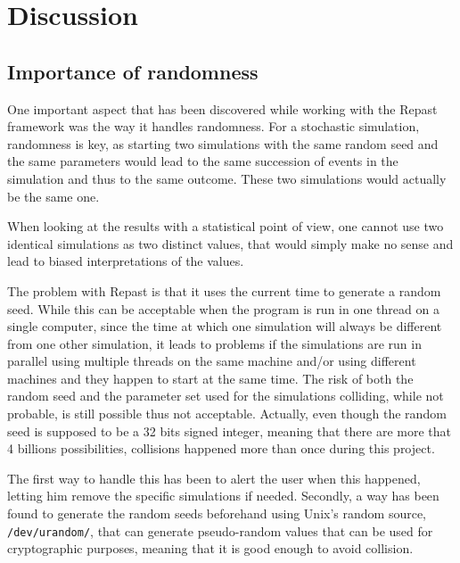 \documentclass[a4paper,12pt]{report}
\begin{document}
\chapter{Discussion}
\section{Importance of randomness}
One important aspect that has been discovered while working with the Repast framework was the way it handles randomness. For a stochastic simulation, randomness is key, as starting two simulations with the same random seed and the same parameters would lead to the same succession of events in the simulation and thus to the same outcome. These two simulations would actually be the same one.

When looking at the results with a statistical point of view, one cannot use two identical simulations as two distinct values, that would simply make no sense and lead to biased interpretations of the values.

The problem with Repast is that it uses the current time to generate a random seed. While this can be acceptable when the program is run in one thread on a single computer, since the time at which one simulation will always be different from one other simulation, it leads to problems if the simulations are run in parallel using multiple threads on the same machine and/or using different machines and they happen to start at the same time. The risk of both the random seed and the parameter set used for the simulations colliding, while not probable, is still possible thus not acceptable. Actually, even though the random seed is supposed to be a 32 bits signed integer, meaning that there are more that 4 billions possibilities, collisions happened more than once during this project.

The first way to handle this has been to alert the user when this happened, letting him remove the specific simulations if needed. Secondly, a way has been found to generate the random seeds beforehand using Unix’s random source, \texttt{/dev/urandom/}, that can generate pseudo-random values that can be used for cryptographic purposes, meaning that it is good enough to avoid collision.
\end{document}
